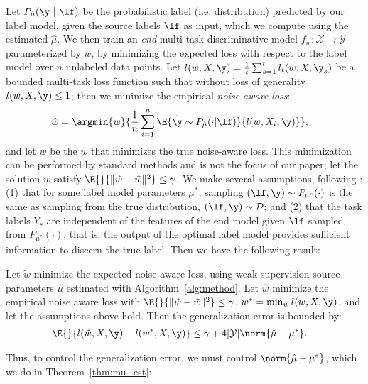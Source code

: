 \documentclass[letterpaper]{article}
\begin{document}
Let $P_{\hat{\mu}}(\tilde{\y}~|~\lf)$ be the probabilistic label (i.e. distribution) predicted by our label model, given the source labels $\lf$ as input, which we compute using the estimated $\hat{\mu}$.
We then train an \textit{end} multi-task discriminative model $f_w : \mathcal{X} \mapsto \mathcal{Y}$ parameterized by $w$, by minimizing the expected loss with respect to the label model over $n$ unlabeled data points.
Let $l(w, X, \y) = \frac1t\sum_{s=1}^t l_t(w, X, \y_s)$ be a bounded multi-task loss function such that without loss of generality $l(w,X,\y) \leq 1$; then we minimize the empirical \textit{noise aware loss}:
\begin{align}
    \hat{w}
    &=
    \argmin{w}{
        \frac{1}{n} \sum_{i=1}^n
        \E{\tilde{\y} \sim P_{\hat{\mu}}(\cdot|\lf)}{ l(w, X_i, \tilde{\y}) }
    },
    \label{eqn:expected_loss}
\end{align}
and let $\tilde{w}$ be the $w$ that minimizes the true noise-aware loss.
This minimization can be performed by standard methods and is not the focus of our paper; let the solution $\hat{w}$ satisfy $\E{}{\|\hat{w} - \tilde{w}\|^2} \leq \gamma$.
We make several assumptions, following \cite{ratner2016data}: (1) that for some label model parameters $\mu^*$, sampling $(\lf, \y) \sim P_{\mu^*}(\cdot)$ is the same as sampling from the true distribution, $(\lf, \y) \sim \mathcal{D}$; and (2) that the task labels $Y_s$ are independent of the features of the end model given $\lf$ sampled from $P_{\mu^*}(\cdot)$, that is, the output of the optimal label model provides sufficient information to discern the true label.
Then we have the following result:
\begin{theorem}
	Let $\tilde{w}$ minimize the expected noise aware loss, using weak supervision source parameters $\hat{\mu}$ estimated with Algorithm~\ref{alg:method}.
	Let $\hat{w}$ minimize the empirical noise aware loss with $\E{}{\|\hat{w} - \tilde{w}\|^2} \leq \gamma$, $w^* = \min_{w} l(w, X,\y)$, and let the assumptions above hold. Then the generalization error is bounded by:
    \begin{align*}
        \E{}{ l(\hat{w},X, \y) -  l(w^*, X, \y) }
        &\leq
        \gamma + 4 |\mathcal{Y}| \norm{ \hat{\mu} - \mu^*}.
    \end{align*}
\end{theorem}
Thus, to control the generalization error, we must control $\norm{ \hat{\mu} - \mu^* }$, which
we do in Theorem~\ref{thm:mu_est}:
\end{document}

